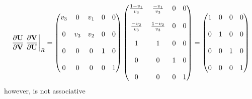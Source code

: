 \begin{equation}
  \frac{\partial \mathbf U}{\partial \mathbf V} \left. \frac{\partial \mathbf V}{\partial \mathbf U}\right|_{R} = 
  \begin{pmatrix}
    v_3 & 0   & v_1 & 0 & 0 \\ \\
    0   & v_3 & v_2 & 0 & 0 \\ \\
    0   & 0   & 0   & 1 & 0 \\ \\
    0   & 0   & 0   & 0 & 1
  \end{pmatrix}
  \begin{pmatrix}
    \frac{1-v_1}{v_3} & \frac{-v_1}{v_3}  & 0 & 0 \\ \\
    \frac{-v_2}{v_3}  & \frac{1-v_2}{v_3} & 0 & 0 \\ \\
    1                 & 1                 & 0 & 0 \\ \\
    0                 & 0                 & 1 & 0 \\ \\
    0                 & 0                 & 0 & 1
  \end{pmatrix}
  =
  \begin{pmatrix}
    1 & 0 & 0 & 0 \\ \\
    0 & 1 & 0 & 0 \\ \\
    0 & 0 & 1 & 0 \\ \\
    0 & 0 & 0 & 1
  \end{pmatrix}
  \label{dvdu-jac-right-I}
\end{equation}
however,  is not associative
